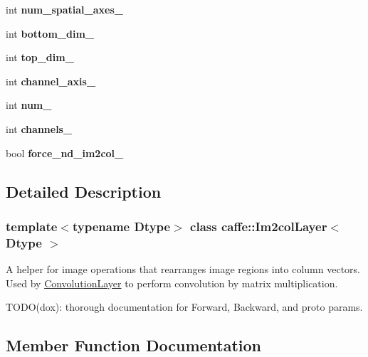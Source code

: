 \begin{DoxyCompactItemize}
int {\bfseries num\+\_\+spatial\+\_\+axes\+\_\+}
\item 
\mbox{\label{classcaffe_1_1_im2col_layer_a3fc7e611b3a47b656158a4b3bce256e7}} 
int {\bfseries bottom\+\_\+dim\+\_\+}
\item 
\mbox{\label{classcaffe_1_1_im2col_layer_af0ea2d0f8f54ef280e8d1af46926c35b}} 
int {\bfseries top\+\_\+dim\+\_\+}
\item 
\mbox{\label{classcaffe_1_1_im2col_layer_ab7775033a0345f84c2f7a7b936b8973e}} 
int {\bfseries channel\+\_\+axis\+\_\+}
\item 
\mbox{\label{classcaffe_1_1_im2col_layer_a0d8977015b84d19c6b1c1a4f2af553c3}} 
int {\bfseries num\+\_\+}
\item 
\mbox{\label{classcaffe_1_1_im2col_layer_a819581a35ffba22f5df2c0340210c2e9}} 
int {\bfseries channels\+\_\+}
\item 
\mbox{\label{classcaffe_1_1_im2col_layer_a49819777152d22c57105bdb61df009a3}} 
bool {\bfseries force\+\_\+nd\+\_\+im2col\+\_\+}
\end{DoxyCompactItemize}


\subsection{Detailed Description}
\subsubsection*{template$<$typename Dtype$>$\newline
class caffe\+::\+Im2col\+Layer$<$ Dtype $>$}

A helper for image operations that rearranges image regions into column vectors. Used by \mbox{\hyperlink{classcaffe_1_1_convolution_layer}{Convolution\+Layer}} to perform convolution by matrix multiplication. 

T\+O\+D\+O(dox)\+: thorough documentation for Forward, Backward, and proto params. 

\subsection{Member Function Documentation}
\mbox{\label{classcaffe_1_1_im2col_layer_a35772d667af49afe707c7b1db881c573}} 
